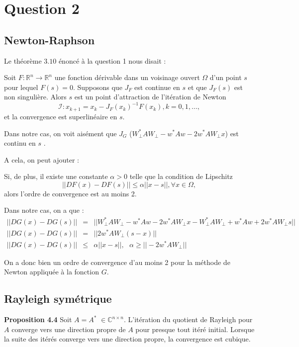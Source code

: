 \section*{Question 2}

\subsection*{Newton-Raphson}

Le théorème $3.10$ énoncé à la question 1 nous disait : 

Soit $F : \mathbb{R}^n \rightarrow \mathbb{R}^n$ une fonction dérivable dans un voisinage ouvert $\Omega$ d'un point $s$ pour lequel $F(s)=0$. Supposons que $J_F$ est continue en $s$ et que $J_F(s)$ est non singulière. Alors $s$ est un point d'attraction de l'itération de Newton $$\mathcal{I} : x_{k+1} = x_k - J_F(x_k)^{-1}F(x_k), k = 0,1,...,$$ et la convergence est superlinéaire en $s$. 

Dans notre cas, on voit aisément que $J_G$ ($W_{\perp}^{*} A W_{\perp}- w^{*} A w - 2 w^{*} A W_{\perp} x$) est continu en $s$ .

A cela, on peut ajouter : 

Si, de plus, il existe une constante $\alpha > 0$ telle que la condition de Lipschitz 
$$||DF(x) - DF(s)|| \leq \alpha || x - s||, \forall x \in \Omega,$$
alors l'ordre de convergence est au moins 2. 

Dans notre cas, on a que : 
\begin{eqnarray}
||DG(x) - DG(s)|| &=& ||W_{\perp}^{*} A W_{\perp}- w^{*} A w - 2 w^{*} A W_{\perp} x - W_{\perp}^{*} A W_{\perp}+ w^{*} A w + 2 w^{*} A W_{\perp} s || \\
||DG(x) - DG(s)|| &=&  ||2 w^{*} A W_{\perp} (s-x) || \\
 ||DG(x) - DG(s)|| &\leq & \alpha || x - s||, \text{	} \alpha \geq || - 2 w^{*} A W_{\perp} ||
\end{eqnarray}

On a donc bien un ordre de convergence d'au moins 2 pour la méthode de Newton appliquée à la fonction $G$.

\subsection*{Rayleigh symétrique}

\textbf{Proposition 4.4} Soit $A = A^*$ $ \in \mathbb{C}^{n\times n}$. L'itération du quotient de Rayleigh pour $A$ converge vers une direction propre de $A$ pour presque tout itéré initial. Lorsque la suite des itérés converge vers une direction propre, la convergence est cubique. 

